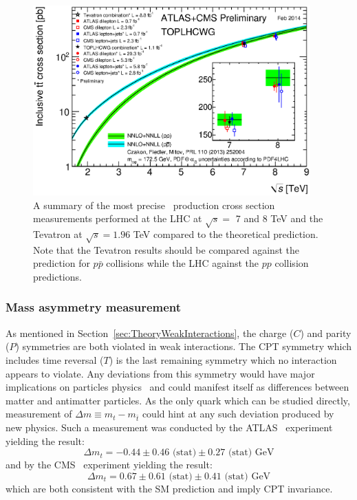 \begin{figure}[htbp]
  \centering
  \includegraphics[width=0.95\textwidth]{PartTopQuark/Plots/tt_xsec_vsroots.eps}
  \caption{A summary of the most precise \ttbar\ production cross section measurements performed at the LHC at $\sqrt{s}=$ 7 and 8 TeV and the Tevatron at $\sqrt{s}=1.96$ TeV compared to the theoretical prediction. Note that the Tevatron results should be compared against the prediction for $p\bar{p}$ collisions while the LHC against the $pp$ collision predictions.}
  \label{fig:TopQuarkPairProductionComparison}
\end{figure}

\subsubsection{Mass asymmetry measurement}

As mentioned in Section~\ref{sec:TheoryWeakInteractions}, the charge ($C$) and parity ($P$) symmetries are both violated in weak interactions. The CPT symmetry which includes time reversal ($T$) is the last remaining symmetry which no interaction appears to violate. Any deviations from this symmetry would have major implications on particles physics~\cite{TopQuark:CPTViolation} and could manifest itself as differences between matter and antimatter particles. As the only quark which can be studied directly, measurement of $\Delta m\equiv m_{t}-m_{\bar{t}}$ could hint at any such deviation produced by new physics. Such a measurement was conducted by the ATLAS~\cite{TopQuark:MassAsymmetryATLAS2014} experiment yielding the result:
%
\begin{equation}
  \Delta m_{t}=-0.44\pm0.46\text{ (stat)}\pm0.27\text{ (stat) GeV}
\end{equation}
%
and by the CMS~\cite{TopQuark:MassAsymmetryCMS2012} experiment yielding the result:
%
\begin{equation}
  \Delta m_{t}=0.67\pm0.61\text{ (stat)}\pm0.41\text{ (stat) GeV}
\end{equation}
%
which are both consistent with the SM prediction and imply CPT invariance.


